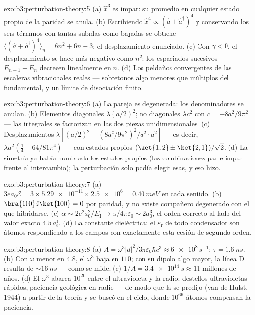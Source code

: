 \begin{solution}{exo:b3:perturbation-theory:5}
(a) $\hat x^3$ es impar: su promedio en cualquier estado propio de la
paridad se anula. (b) Escribiendo $\hat x^4 \propto (\hat a + \hat
a^\dagger)^4$ y conservando los seis términos con tantas subidas como
bajadas se obtiene $\langle(\hat a + \hat a^\dagger)^4\rangle_n = 6n^2
+ 6n + 3$: el desplazamiento enunciado. (c) Con $\gamma < 0$, el
desplazamiento se hace más negativo como $n^2$: los espaciados sucesivos
$E_{n+1} - E_n$ decrecen linealmente en $n$. (d) Los peldaños convergentes
de las escaleras vibracionales reales --- sobretonos algo menores que
múltiplos del fundamental, y un límite de disociación finito.
\end{solution}

\begin{solution}{exo:b3:perturbation-theory:6}
(a) La pareja es degenerada: los denominadores se anulan. (b) Elementos
diagonales $\lambda(a/2)^2$; no diagonales $\lambda c^2$ con $c =
-8a^2/9\pi^2$ --- las integrales se factorizan en las dos piezas
unidimensionales. (c) Desplazamientos $\lambda[(a/2)^2 \pm
(8a^2/9\pi^2)^2/a^2\cdot a^2]$ --- es decir, $\lambda a^2(\tfrac14 \pm
64/81\pi^4)$ --- con estados propios $(\ket{1,2} \pm \ket{2,1})/
\sqrt2$. (d) La simetría ya había nombrado los estados propios (las
combinaciones par e impar frente al intercambio); la perturbación solo podía
elegir esas, y eso hizo.
\end{solution}

\begin{solution}{exo:b3:perturbation-theory:7}
(a) $3ea_0\mathcal E = 3 \times \num{5.29e-11} \times \num{2.5e6}
= \qty{0.40}{meV}$ en cada sentido. (b) $\bra{100}\hat z\ket{100} = 0$ por
paridad, y no existe compañero degenerado con el que hibridarse. (c)
$\alpha \sim 2e^2a_0^2/E_{\text{I}} \to \alpha/4\pi\varepsilon_0
\sim 2a_0^3$, el orden correcto al lado del valor exacto $4.5\,a_0^3$. (d)
La constante dieléctrica: el $\varepsilon_{\text{r}}$ de todo condensador
son átomos respondiendo a los campos con exactamente esta cesión de segundo
orden.
\end{solution}

\begin{solution}{exo:b3:perturbation-theory:8}
(a) $A = \omega^3|d|^2/3\pi\varepsilon_0\hbar c^3 \approx
\qty{6e8}{s^{-1}}$: $\tau = \qty{1.6}{ns}$. (b) Con $\omega$ menor en
$4.8$, el $\omega^3$ baja en $110$; con su dipolo algo mayor, la línea D
resulta de $\sim\qty{16}{ns}$ --- como se mide. (c)
$1/A = \qty{3.4e14}{s} \approx 11$ millones de años. (d) El $\omega^3$
abarca $10^{20}$ entre el ultravioleta y la radio: destellos ultravioletas
rápidos, paciencia geológica en radio --- de modo que la  se
predijo (van de Hulst, 1944) a partir de la teoría y se buscó en el cielo,
donde $10^{66}$ átomos compensan la paciencia.
\end{solution}

